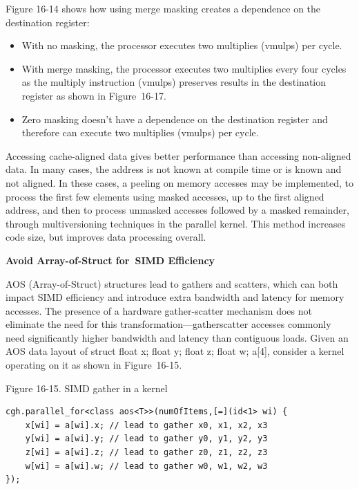 Figure 16-14 shows how using merge masking creates a dependence on the destination register:\par

\begin{itemize}
	\item With no masking, the processor executes two multiplies (vmulps) per cycle.
	\item With merge masking, the processor executes two multiplies every four cycles as the multiply instruction (vmulps) preserves results in the destination register as shown in Figure 16-17.
	\item Zero masking doesn’t have a dependence on the destination register and therefore can execute two multiplies (vmulps) per cycle.
\end{itemize}

Accessing cache-aligned data gives better performance than accessing non-aligned data. In many cases, the address is not known at compile time or is known and not aligned. In these cases, a peeling on memory accesses may be implemented, to process the first few elements using masked accesses, up to the first aligned address, and then to process unmasked accesses followed by a masked remainder, through multiversioning techniques in the parallel kernel. This method increases code size, but improves data processing overall.\par

\hspace*{\fill} \par %
\textbf{Avoid Array-of-Struct for SIMD Efficiency}

AOS (Array-of-Struct) structures lead to gathers and scatters, which can both impact SIMD efficiency and introduce extra bandwidth and latency for memory accesses. The presence of a hardware gather-scatter mechanism does not eliminate the need for this transformation—gatherscatter accesses commonly need significantly higher bandwidth and latency than contiguous loads. Given an AOS data layout of struct {float x; float y; float z; float w;} a[4], consider a kernel operating on it as shown in Figure 16-15.\par

\hspace*{\fill} \par %
Figure 16-15. SIMD gather in a kernel
\begin{lstlisting}[caption={}]
cgh.parallel_for<class aos<T>>(numOfItems,[=](id<1> wi) {
	x[wi] = a[wi].x; // lead to gather x0, x1, x2, x3
	y[wi] = a[wi].y; // lead to gather y0, y1, y2, y3
	z[wi] = a[wi].z; // lead to gather z0, z1, z2, z3 
	w[wi] = a[wi].w; // lead to gather w0, w1, w2, w3
});
\end{lstlisting}

